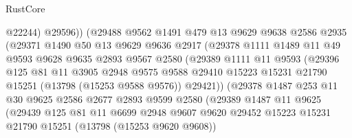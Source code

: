 \begin{lexlean}{RustCore}
\begin{coremodule}
                          @22244)
                        @29596))
                    (@29488
                      @9562
                      @1491
                      @479
                      @13
                      @9629
                      @9638
                      @2586
                      @2935
                      (@29371
                        @1490
                        @50
                        @13
                        @9629
                        @9636
                        @2917
                        (@29378
                          @1111
                          @1489
                          @11
                          @49
                          @9593
                          @9628
                          @9635
                          @2893
                          @9567
                          @2580
                          (@29389
                            @1111
                            @11
                            @9593
                            (@29396
                              @125
                              @81
                              @11
                              @3905
                              @2948
                              @9575
                              @9588
                              @29410
                              @15223
                              @15231
                              @21790
                              @15251
                              (@13798 (@15253 @9588 @9576))
                              @29421))
                          (@29378
                            @1487
                            @253
                            @11
                            @30
                            @9625
                            @2586
                            @2677
                            @2893
                            @9599
                            @2580
                            (@29389
                              @1487
                              @11
                              @9625
                              (@29439
                                @125
                                @81
                                @11
                                @6699
                                @2948
                                @9607
                                @9620
                                @29452
                                @15223
                                @15231
                                @21790
                                @15251
                                (@13798 (@15253 @9620 @9608))

\end{coremodule}
\end{lexlean}
